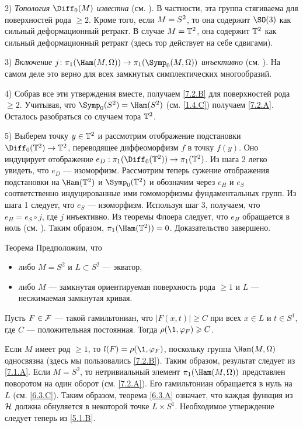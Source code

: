 2) \textit{Топология $\Diff_0 (M)$ известна} (см. \cite{EE}).
В частности, эта группа стягиваема для поверхностей рода $\ge 2$.
Кроме того, если $M \z= S^2$, то она содержит $\SO (3)$ как сильный
деформационный ретракт. 
В случае $M = \mathbb{T}^2$, она содержит $\mathbb{T}^2$ как сильный деформационный
ретракт (здесь тор действует на себе сдвигами). 

3) \textit{Включение $j\: \pi_1 (\Ham (M, \Omega)) \to \pi_1 (\Symp_0 (M,
\Omega))$ инъективно} (см. \cite[10.18 iii]{MS}). 
На самом деле это верно для всех замкнутых симплектических многообразий.

4) Собрав все эти утверждения вместе, получаем \ref{7.2.B} для
поверхностей рода $\ge 2$. 
Учитывая, что $\Symp_0 (S^2) = \Ham (S^2)$ (см. \ref{1.4.C}) получаем
\ref{7.2.A}. 
Осталось разобраться со случаем тора $\mathbb{T}^2$.

5) Выберем точку $y \in \mathbb{T}^2$ и рассмотрим отображение подстановки $\Diff_0 (\TT^2) \to \TT^2$,
переводящее диффеоморфизм $f$ в точку $f(y)$. 
Оно индуцирует отображение $e_D: \pi_1 (\Diff_0 (\TT^2)) \to \pi_1 (\TT^2)$.
Из шага 2 легко увидеть, что $e_D$ — изоморфизм.
Рассмотрим теперь сужение отображения подстановки на $\Ham (\TT^2)$ и
$\Symp_0 (\TT^2)$ и обозначим через $e_H$ и $e_S$ соответственно
индуцированные ими гомоморфизмы фундаментальных групп. 
Из шага 1 следует, что $e_S$ — изоморфизм.
Используя шаг 3, получаем, что $e_H = e_S \circ j$, где $j$ инъективно.
Из теоремы Флоера следует, что $e_H$ обращается в ноль (см. \cite{LMP1}).
Таким образом, $\pi_1 (\Ham (\TT^2)) = 0$. 
Доказательство завершено. 
\qeds

\begin{thm}[(\cite{P5})]{Теорема}\label{7.2.C}
Предположим, что 
\begin{itemize}
\item либо $M = S^2$ и $L \subset S^2$ — экватор, 
\item либо $M$ — замкнутая ориентируемая поверхность рода $\ge 1$ и $L$ — несжимаемая замкнутая кривая.
\end{itemize}
Пусть $F \in \mathcal{F}$ — такой гамильтониан, что $|F(x,t)| \ge C$ при всех $x \in L$ и $t \in S^1$, где $C$ — положительная постоянная.
Тогда $\rho (\1, \phi_F) \z\ge C$.
\end{thm}

Если $M$ имеет род $\ge 1$, то $l (F) = \rho (\1, \phi_F)$, поскольку группа $\Ham (M, \Omega)$ односвязна (здесь мы пользовались \ref{7.2.B}).
Таким образом, результат следует из \ref{7.1.A}.
Если $M = S^2$, то нетривиальный элемент $\pi_1 (\Ham (M, \Omega))$ представлен поворотом на один оборот (см. \ref{7.2.A}).
Его гамильтониан обращается в нуль на $L$ (см. \ref{6.3.C}).
Таким образом, теорема \ref{6.3.A} означает, что каждая функция из $\mathcal{H}$ должна обнуляется в некоторой точке $L \times S^1$.
Необходимое утверждение следует теперь из \ref{5.1.B}.
\qeds


